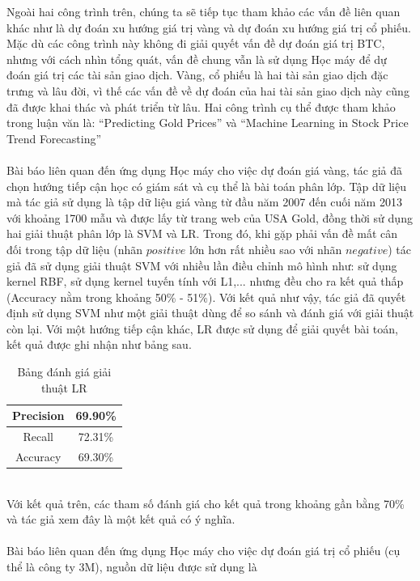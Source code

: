 Ngoài hai công trình trên, chúng ta sẽ tiếp tục tham khảo các vấn đề liên quan 
khác như là dự đoán xu hướng giá trị vàng và dự đoán xu hướng giá trị cổ phiếu.
Mặc dù các công trình này không đi giải quyết vấn đề dự đoán giá trị BTC, nhưng 
với cách nhìn tổng quát, vấn đề chung vẫn là sử dụng Học máy để dự đoán giá trị 
các tài sản giao dịch. Vàng, cổ phiếu là hai tài sản giao dịch đặc trưng và lâu 
đời, vì thế các vấn đề về dự đoán của hai tài sản giao dịch này cũng đã được 
khai thác và phát triển từ lâu. Hai công trình cụ thể được tham khảo trong luận văn là: 
``Predicting Gold Prices'' \cite{PredictingGoldPrices} và 
``Machine Learning in Stock Price Trend Forecasting'' 
\cite{StockPriceTrendForecasting} \\\\ 
Bài báo \cite{PredictingGoldPrices} liên quan đến ứng dụng Học máy cho việc dự đoán 
giá vàng, tác giả đã chọn hướng tiếp cận học có giám sát và cụ thể là bài toán 
phân lớp. Tập dữ liệu mà tác giả sử dụng là tập dữ liệu giá vàng từ đầu năm 2007 
đến cuối năm 2013 với khoảng 1700 mẫu và được lấy từ trang web của USA Gold, 
đồng thời sử dụng hai giải thuật phân lớp là SVM và LR.
Trong đó, khi gặp phải vấn đề mất cân đối trong tập dữ liệu (nhãn $positive$ 
lớn hơn rất nhiều sao với nhãn $negative$) tác giả đã sử dụng giải thuật SVM 
với nhiều lần điều chỉnh mô hình như: sử dụng kernel RBF, sử dụng kernel tuyến 
tính với L1,... nhưng đều cho ra kết quả thấp (Accuracy nằm trong khoảng 50\% 
- 51\%). Với kết quả như vậy, tác giả đã quyết định sử dụng SVM như một giải 
thuật dùng để so sánh và đánh giá với giải thuật còn lại. Với một hướng tiếp 
cận khác, LR được sử dụng để giải quyết bài toán, kết quả được ghi nhận như 
bảng sau.
\begin{table}[h]
\centering
\begin{tabular}{ |c|c| }
\hline
Precision & 69.90\% \\
\hline
Recall & 72.31\% \\
\hline
Accuracy & 69.30\% \\
\hline
\end{tabular}
\caption{Bảng đánh giá giải thuật LR}
\end{table}\\
Với kết quả trên, các tham số đánh giá cho kết quả trong khoảng gần bằng 70\% 
và tác giả xem đây là một kết quả có ý nghĩa.\\\\
Bài báo \cite{StockPriceTrendForecasting} liên quan đến ứng dụng Học máy cho việc 
dự đoán giá trị cổ phiếu (cụ thể là công ty 3M), nguồn dữ liệu được sử dụng là 
